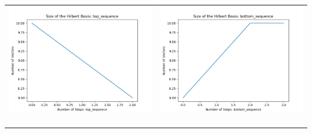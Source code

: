 \documentclass[10pt]{article}
\begin{document}
\begin{tabular}{c|c}
\begin{minipage}{.4\textwidth}
\includegraphics[width=\textwidth]{"DATA/5d/6 generators 1 bound G/top_sequence SIZE"}
\end{minipage} &
\begin{minipage}{.4\textwidth}
\includegraphics[width=\textwidth]{"DATA/5d/6 generators 1 bound G bottomup/bottom_sequence SIZE"}
\end{minipage} \\ \\
\hline \\\begin{minipage}{.4\textwidth}

\end{minipage}
\end{tabular}
\end{document}
